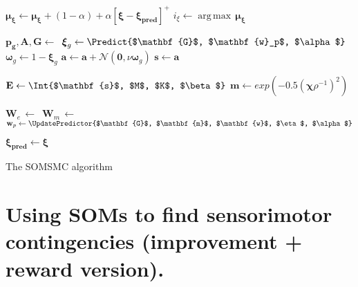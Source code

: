 \documentclass[a4paper]{article}
\DeclareMathOperator*{\argmax}{\operatorname*{arg\,max}} %
\begin{document}
\begin{algorithm}[H]
{{        \BlankLine
      
        $\boldsymbol{\mu_{\xi}}\leftarrow\boldsymbol{\mu_{\xi}} + 
        	\left(1-\alpha\right) + \alpha\left[\boldsymbol{\xi} - 
            \boldsymbol{\xi_{pred}}\right]^{+}$\;
        $i_{\xi} \leftarrow \argmax\,\boldsymbol{\mu_{\xi}}$\;
                
        \BlankLine
         
    	$\mathbf{p_g}, \mathbf{A},\mathbf{G}\leftarrow$\,
        	\;  
        $\boldsymbol{\xi}_{g}\leftarrow\Predict{$\mathbf{G}$, 
        	$\mathbf{w}_p$, $\alpha$}$\;
        $\boldsymbol{\omega}_{g}\leftarrow 1 - \boldsymbol{\xi}_{g}$\;
        $\mathbf{a}\leftarrow\mathbf{a} + \mathcal{N}(\mathbf{0}, 
        	\nu\boldsymbol{\omega}_{g})$\; 
        $\mathbf{s}\leftarrow\mathbf{a}$\;
        
        \BlankLine
         
        $\mathbf{E}\leftarrow\Int{$\mathbf{s}$, $M$, $K$, 
        	$\beta$}$\;
		$\mathbf{m} \leftarrow exp(-0.5(\boldsymbol{\chi}\rho^{-1})^2)$\;
                   
        \BlankLine
        
        $\mathbf{W}_e\,\leftarrow$\,\;
        $\mathbf{W}_m\,\leftarrow$\,\;       
        $\mathbf{w}_p\leftarrow\UpdatePredictor{$\mathbf{G}$, 
        	$\mathbf{m}$, $\mathbf{w}$, $\eta$, $\alpha$}$\;
                            
        \BlankLine
        
        $\boldsymbol{\xi_{pred}} \leftarrow \boldsymbol{\xi}$
                                    
        \BlankLine
          
    }
}
\caption{The SOMSMC algorithm}\label{smc2}
\end{algorithm}
\DecMargin{1em}

\pagebreak
\section*{Using SOMs to find sensorimotor contingencies (improvement + reward version).}
\end{document}
